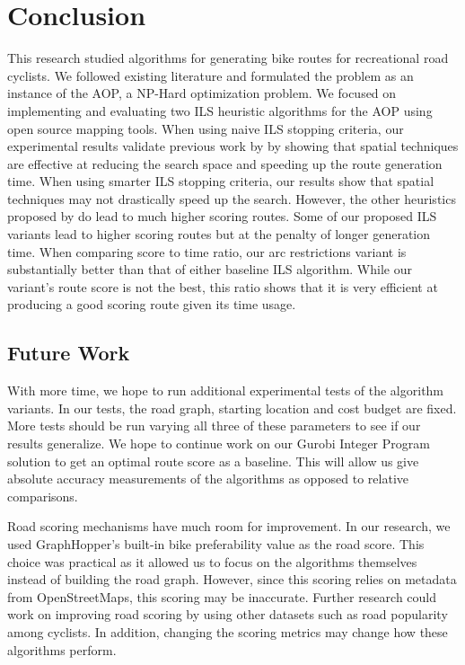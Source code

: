 \documentclass[honors]{union-cs-thesis}
\begin{document}
\section{Conclusion}
This research studied algorithms for generating bike routes for recreational road cyclists. We followed existing literature and formulated the problem as an instance of the AOP, a NP-Hard optimization problem. We focused on implementing and evaluating two ILS heuristic algorithms \cite{verbeeck2014extension} \cite{lu2015arc} for the AOP using open source mapping tools. When using naive ILS stopping criteria, our experimental results validate previous work by \cite{lu2015arc} by showing that spatial techniques are effective at reducing the search space and speeding up the route generation time. When using smarter ILS stopping criteria, our results show that spatial techniques may not drastically speed up the search. However, the other heuristics proposed by \cite{lu2015arc} do lead to much higher scoring routes. Some of our proposed ILS variants lead to higher scoring routes but at the penalty of longer generation time. When comparing score to time ratio, our arc restrictions variant is substantially better than that of either baseline ILS algorithm. While our variant's route score is not the best, this ratio shows that it is very efficient at producing a good scoring route given its time usage.

\subsection{Future Work}
With more time, we hope to run additional experimental tests of the algorithm variants. In our tests, the road graph, starting location and cost budget are fixed. More tests should be run varying all three of these parameters to see if our results generalize. We hope to continue work on our Gurobi Integer Program solution to get an optimal route score as a baseline. This will allow us give absolute accuracy measurements of the algorithms as opposed to relative comparisons.  

Road scoring mechanisms have much room for improvement. In our research, we used GraphHopper's built-in bike preferability value as the road score. This choice was practical as it allowed us to focus on the algorithms themselves instead of building the road graph. However, since this scoring relies on metadata from OpenStreetMaps, this scoring may be inaccurate. Further research could work on improving road scoring by using other datasets such as road popularity among cyclists. In addition, changing the scoring metrics may change how these algorithms perform.
\end{document}
